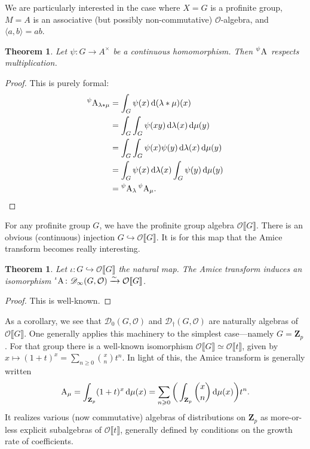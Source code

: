 \documentclass{article}
\newcommand{\bZ}{\mathbf{Z}}
\newcommand{\cO}{\mathcal{O}}
\newcommand{\dd}{\mathrm{d}}
\newcommand{\sD}{\mathscr{D}}
\newcommand{\amice}[2][]{\prescript{#1}{}{\mathrm{A}_{#2}}}
\newcommand{\pow}[1]{\llbracket #1 \rrbracket}
\newtheorem{theorem}[subsection]{Theorem}
\theoremstyle{definition}
\begin{document}
We are particularly interested in the case where $X=G$ is a profinite group, 
$M=A$ is an associative (but possibly non-commutative) $\cO$-algebra, and 
$\langle a,b\rangle = a b$. 

\begin{theorem}
Let $\psi\colon G\to A^\times$ be a continuous homomorphism. Then 
$\amice[\psi]{}$ respects multiplication.
\end{theorem}
\begin{proof}
This is purely formal:
\begin{align*}
  \amice[\psi]{\lambda\ast\mu} 
    &= \int_G \psi(x)\, \dd(\lambda\ast\mu)(x) \\
    &= \int_G \int_G \psi(x y)\, \dd\lambda(x) \, \dd \mu(y) \\
    &= \int_G \int_G \psi(x)\psi(y)\, \dd \lambda(x) \, \dd\mu(y) \\
    &= \int_G \psi(x)\, \dd\lambda(x) \int_G \psi(y) \, \dd\mu(y) \\
    &= \amice[\psi]{\lambda} \amice[\psi]{\mu} .
\end{align*}
\end{proof}

For any profinite group $G$, we have the profinite group algebra $\cO\pow{G}$. 
There is an obvious (continuous) injection $G\hookrightarrow \cO\pow{G}$. It is 
for this map that the Amice transform becomes really interesting. 

\begin{theorem}
Let $\iota\colon G\hookrightarrow \cO\pow{G}$ the natural map. The Amice 
transform induces an isomorphism 
$\amice[\iota]{}\colon \sD_\infty(G,\cO)\xrightarrow\sim\cO\pow{G}$. 
\end{theorem}
\begin{proof}
This is well-known. 
\end{proof}

As a corollary, we see that $\sD_0(G,\cO)$ and $\sD_\dagger(G,\cO)$ are 
naturally algebras of $\cO\pow{G}$. One generally applies this machinery to 
the simplest case---namely $G=\bZ_p$. For that group there is a well-known 
isomorphism $\cO\pow{G}\simeq \cO\pow{t}$, given by 
$x\mapsto (1+t)^x=\sum_{n\geqslant 0} \binom{x}{n} t^n$. In light of this, the 
Amice transform is generally written 
\[
  \amice{\mu} = \int_{\bZ_p} (1+t)^x\, \dd\mu(x) = \sum_{n\geqslant 0}\bigg(\int_{\bZ_p} \binom{x}{n}\, \dd\mu(x)\bigg)t^n .
\]
It realizes various (now commutative) algebras of distributions on $\bZ_p$ as 
more-or-less explicit subalgebras of $\cO\pow{t}$, generally defined by 
conditions on the growth rate of coefficients. 
\end{document}
